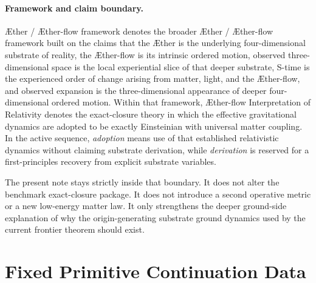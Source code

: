 \documentclass[11pt]{article}
\newcommand{\Aether}{\AE{}ther}
\newcommand{\Aflow}{\AE{}ther-flow}
\newcommand{\TheoryName}{\Aflow{} Interpretation of Relativity}
\newcommand{\TheoryProgram}{\Aether{} / \Aflow{} framework}
\begin{document}
\paragraph{Framework and claim boundary.}
\TheoryProgram{} denotes the broader \Aether{} / \Aflow{} framework built on the claims that the \Aether{} is the underlying four-dimensional substrate of reality, the \Aflow{} is its intrinsic ordered motion, observed three-dimensional space is the local experiential slice of that deeper substrate, S-time is the experienced order of change arising from matter, light, and the \Aflow{}, and observed expansion is the three-dimensional appearance of deeper four-dimensional ordered motion. Within that framework, \TheoryName{} denotes the exact-closure theory in which the effective gravitational dynamics are adopted to be exactly Einsteinian with universal matter coupling. In the active sequence, \emph{adoption} means use of that established relativistic dynamics without claiming substrate derivation, while \emph{derivation} is reserved for a first-principles recovery from explicit substrate variables.

The present note stays strictly inside that boundary. It does not alter the benchmark exact-closure package. It does not introduce a second operative metric or a new low-energy matter law. It only strengthens the deeper ground-side explanation of why the origin-generating substrate ground dynamics used by the current frontier theorem should exist.

\section{Fixed Primitive Continuation Data}
\end{document}
